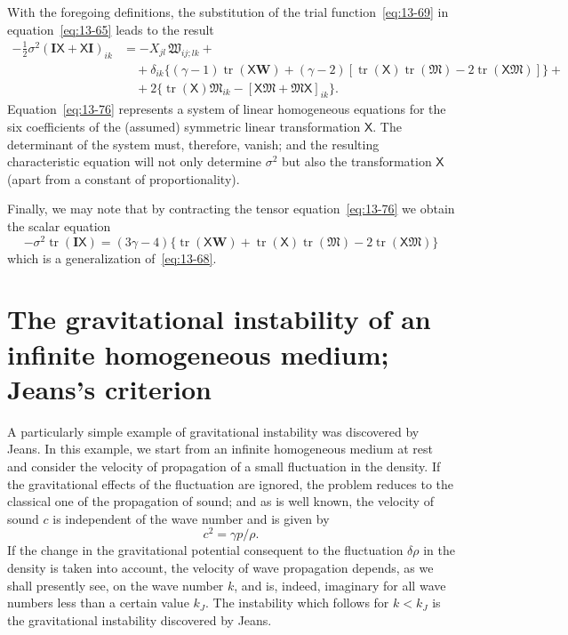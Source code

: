 With the foregoing definitions, the substitution of the trial function~\eqref{eq:13-69} in equation~\eqref{eq:13-65} leads to the result
\begin{equation}
\label{eq:13-76}
\begin{split}
-\tfrac{1}{2}\sigma^2(\mathbf{I}\mathsf{X}+\mathsf{X}\mathbf{I})_{ik}
&= -X_{jl}\,\mathfrak{W}_{ij;lk} + \\
&\quad + \delta_{ik}\{(\gamma-1)\operatorname{tr}(\mathsf{X}\mathbf{W}) + (\gamma-2)[\operatorname{tr}(\mathsf{X})\operatorname{tr}(\boldsymbol{\mathfrak{M}}) - 2\operatorname{tr}(\mathsf{X}\boldsymbol{\mathfrak{M}})]\} + \\
&\quad + 2\{\operatorname{tr}(\mathsf{X})\mathfrak{M}_{ik} - [\mathsf{X}\boldsymbol{\mathfrak{M}} + \boldsymbol{\mathfrak{M}}\mathsf{X}]_{ik}\}.
\end{split}
\end{equation}
Equation~\eqref{eq:13-76} represents a system of linear homogeneous equations for the six coefficients of the (assumed) symmetric linear transformation $\mathsf{X}$. The determinant of the system must, therefore, vanish; and the resulting characteristic equation will not only determine $\sigma^2$ but also the transformation $\mathsf{X}$ (apart from a constant of proportionality).

Finally, we may note that by contracting the tensor equation~\eqref{eq:13-76} we obtain the scalar equation
\begin{equation}
\label{eq:13-77}
-\sigma^2 \operatorname{tr}(\mathbf{I}\mathsf{X}) = (3\gamma-4)\{\operatorname{tr}(\mathsf{X}\mathbf{W})+\operatorname{tr}(\mathsf{X})\operatorname{tr}(\boldsymbol{\mathfrak{M}}) - 2\operatorname{tr}(\mathsf{X}\boldsymbol{\mathfrak{M}})\}
\end{equation}
which is a generalization of~\eqref{eq:13-68}.

\section{The gravitational instability of an infinite homogeneous medium; Jeans's criterion}
\label{sec:119}

A particularly simple example of gravitational instability was discovered by Jeans. In this example, we start from an infinite homogeneous medium at rest and consider the velocity of propagation of a small fluctuation in the density. If the gravitational effects of the fluctuation are ignored, the problem reduces to the classical one of the propagation of sound; and as is well known, the velocity of sound $c$ is independent of the wave number and is given by
\begin{equation}
\label{eq:13-78}
c^2 = \gamma p/\rho.
\end{equation}
If the change in the gravitational potential consequent to the fluctuation $\delta\rho$ in the density is taken into account, the velocity of wave propagation depends, as we shall presently see, on the wave number $k$, and is, indeed, imaginary for all wave numbers less than a certain value $k_J$. The instability which follows for $k < k_J$ is the gravitational instability discovered by Jeans.


